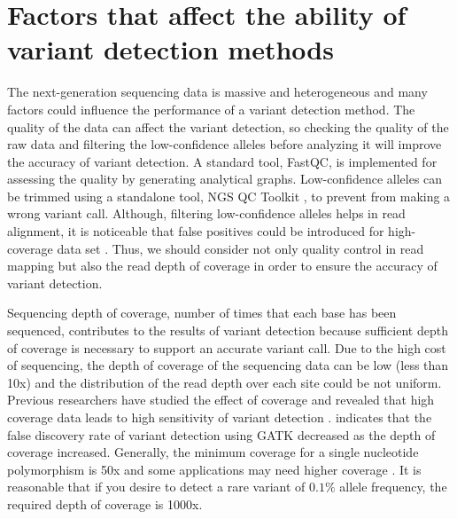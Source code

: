 \documentclass[11pt,reqno]{amsart}
\begin{document}
\section{Factors that affect the ability of variant detection methods}
The next-generation sequencing data is massive and heterogeneous and many factors could influence the performance of a variant detection method.
The quality of the data can affect the variant detection, so checking the quality of the raw data and filtering the low-confidence alleles before analyzing it will improve the accuracy of variant detection.
A standard tool, FastQC, is implemented for assessing the quality by generating analytical graphs.
Low-confidence alleles can be trimmed using a standalone tool, NGS QC Toolkit \citep{patel2012ngs}, to prevent from making a wrong variant call.
Although, filtering low-confidence alleles helps in read alignment, it is noticeable that false positives could be introduced for high-coverage data set \citep{liu2012steps}.
Thus, we should consider not only quality control in read mapping but also the read depth of coverage in order to ensure the accuracy of variant detection.

Sequencing depth of coverage, number of times that each base has been sequenced, contributes to the results of variant detection because sufficient depth of coverage is necessary to support an accurate variant call.
Due to the high cost of sequencing, the depth of coverage of the sequencing data can be low (less than 10x) and the distribution of the read depth over each site could be not uniform.
Previous researchers have studied the effect of coverage and revealed that high coverage data leads to high sensitivity of variant detection \citep{neuman2013analysis, krawitz2010microindel}.
\citep{liu2013variant} indicates that the false discovery rate of variant detection using GATK decreased as the depth of coverage increased.
Generally, the minimum coverage for a single nucleotide polymorphism is 50x and some applications may need higher coverage \citep{Schlotterer2014}.
It is reasonable that if you desire to detect a rare variant of $0.1 \%$ allele frequency, the required depth of coverage is 1000x.
\end{document}
